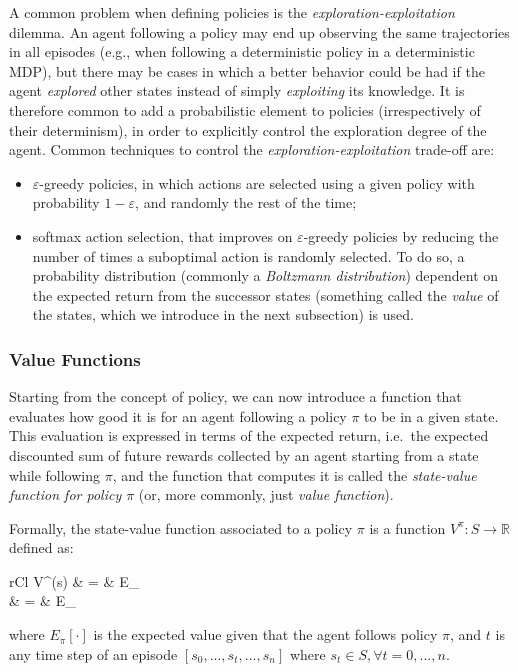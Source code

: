 A common problem when defining policies is the \textit{exploration-exploitation}
dilemma. An agent following a policy may end up observing the same trajectories 
in all episodes (e.g., when following a deterministic policy in a deterministic 
MDP), but there may be cases in which a better behavior could be had if the 
agent \textit{explored} other states instead of simply \textit{exploiting} its 
knowledge. 
It is therefore common to add a probabilistic element to policies 
(irrespectively of their determinism), in order to explicitly control the 
exploration degree of the agent. Common techniques to control the 
\textit{exploration-exploitation} trade-off are:
%
\begin{itemize}
    \item $\varepsilon$-greedy policies, in which actions are selected using a 
    given policy with probability $1-\varepsilon$, and randomly the rest of the 
    time;
    \item softmax action selection, that improves on $\varepsilon$-greedy 
    policies by reducing the number of times a suboptimal action is randomly 
    selected. To do so, a probability distribution (commonly a \textit{Boltzmann
    distribution}) dependent on the expected return from the successor states 
    (something called the \textit{value} of the states, which we introduce in 
     the next subsection) is used.
\end{itemize}
%
\subsubsection{Value Functions}
Starting from the concept of policy, we can now introduce a function that 
evaluates how good it is for an agent following a policy $\pi$ to be in a given 
state. This evaluation is expressed in terms of the expected return, i.e.\
the expected discounted sum of future rewards collected by an agent starting 
from a state while following $\pi$, and the function that computes it is 
called the \textit{state-value function for policy $\pi$} (or, more commonly, 
just \textit{value function}).

Formally, the state-value function associated to a policy $\pi$ is a function 
$V^{\pi}: S \rightarrow \mathbb{R}$ defined as:
%
\begin{IEEEeqnarray}{rCl}
    V^{\pi}(s) & = & E_\pi[R_t | s_t = s] \\
    & = & E_\pi[\sum\limits_{k = 0}^{\infty} \gamma^k r_{t+k+1} | s_t = s]
\end{IEEEeqnarray}
%
where $E_\pi[\cdot]$ is the expected value given that the agent follows 
policy $\pi$, and $t$ is any time step of an episode $[s_0, ..., s_t, ..., s_n]$
where $s_t \in S, \forall t = 0, ..., n$.

